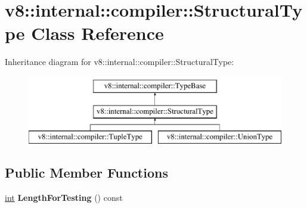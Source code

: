 \hypertarget{classv8_1_1internal_1_1compiler_1_1StructuralType}{}\section{v8\+:\+:internal\+:\+:compiler\+:\+:Structural\+Type Class Reference}
\label{classv8_1_1internal_1_1compiler_1_1StructuralType}
Inheritance diagram for v8\+:\+:internal\+:\+:compiler\+:\+:Structural\+Type\+:\begin{figure}[H]
\begin{center}
\leavevmode
\includegraphics[height=3.000000cm]{classv8_1_1internal_1_1compiler_1_1StructuralType}
\end{center}
\end{figure}
\subsection*{Public Member Functions}
\begin{DoxyCompactItemize}
\item 
\mbox{\label{classv8_1_1internal_1_1compiler_1_1StructuralType_a7a2ae95b270cb0a9c895801dc9a27355}} 
\mbox{\hyperlink{classint}{int}} {\bfseries Length\+For\+Testing} () const
\end{DoxyCompactItemize}
